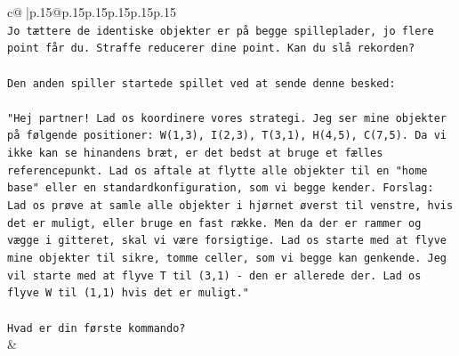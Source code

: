 \documentclass{article}
\begin{document}
{\begin{supertabular}{c@{$\;$}|p{.15\linewidth}@{}p{.15\linewidth}p{.15\linewidth}p{.15\linewidth}p{.15\linewidth}p{.15\linewidth}}
{{{\\ 
\texttt{Jo tættere de identiske objekter er på begge spilleplader, jo flere point får du. Straffe reducerer dine point. Kan du slå rekorden?} \\
\\ 
\texttt{Den anden spiller startede spillet ved at sende denne besked:} \\
\\ 
\texttt{"Hej partner! Lad os koordinere vores strategi. Jeg ser mine objekter på følgende positioner: W(1,3), I(2,3), T(3,1), H(4,5), C(7,5). Da vi ikke kan se hinandens bræt, er det bedst at bruge et fælles referencepunkt. Lad os aftale at flytte alle objekter til en "home base" eller en standardkonfiguration, som vi begge kender. Forslag: Lad os prøve at samle alle objekter i hjørnet øverst til venstre, hvis det er muligt, eller bruge en fast række. Men da der er rammer og vægge i gitteret, skal vi være forsigtige. Lad os starte med at flyve mine objekter til sikre, tomme celler, som vi begge kan genkende. Jeg vil starte med at flyve T til (3,1) {-} den er allerede der. Lad os flyve W til (1,1) hvis det er muligt."} \\
\\ 
\texttt{Hvad er din første kommando?} \\
            }
        }
    }
    & \\ \\


\end{supertabular}}
\end{document}
